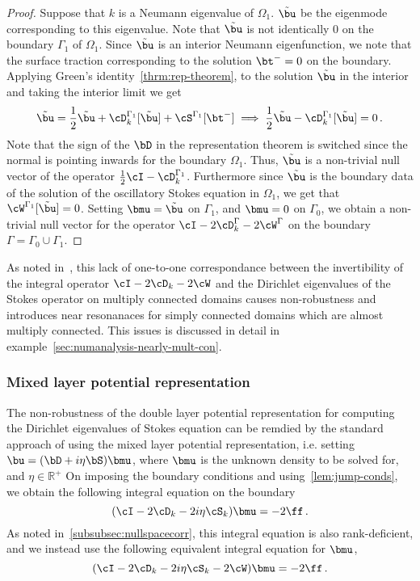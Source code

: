 \begin{proof}
Suppose that $k$ is a Neumann eigenvalue of $\Omega_{1}$. 
$\tilde{\bu}$ be the eigenmode corresponding to this eigenvalue. 
Note that $\tilde{\bu}$ is not identically $0$ on the boundary $\Gamma_{1}$
of $\Omega_{1}$.
Since $\tilde{\bu}$ is an interior Neumann eigenfunction, we note that
the surface traction corresponding to the solution $\bt^{-} = 0$
on the boundary.
Applying Green's identity~\cref{thrm:rep-theorem}, to the solution 
$\tilde{\bu}$ in the interior and taking the interior limit we get
\begin{equation}
\tilde{\bu} = \frac{1}{2}\tilde{\bu} + \cD^{\Gamma_{1}}_{k}[\tilde{\bu}] +
\cS^{\Gamma_{1}} [\bt^{-}] \implies \frac{1}{2} \tilde{\bu} - \cD^{\Gamma_{1}}_{k}[\tilde{\bu}]
= 0\, .
\end{equation}
Note that the sign of the $\bD$ in the representation theorem is switched
since the normal is pointing inwards for the boundary $\Omega_{1}$.
Thus, $\tilde{\bu}$ is a non-trivial null vector of the operator 
$\frac{1}{2}\cI - \cD^{\Gamma_{1}}_{k}$. 
Furthermore since $\tilde{\bu}$ is the boundary data of 
the solution of the oscillatory Stokes equation in $\Omega_{1}$, we
get that $\cW^{\Gamma_{1}}[\tilde{\bu}] = 0$.
Setting $\bmu = \tilde{\bu}$ on $\Gamma_{1}$, and $\bmu = 0$ on $\Gamma_{0}$,
we obtain a non-trivial null vector for the operator $\cI - 2\cD^{\Gamma}_{k} -2\cW^{\Gamma}$
on the boundary $\Gamma = \Gamma_{0} \cup \Gamma_{1}$.
\end{proof}

As noted in~\cite{zhao2015robust}, this lack of one-to-one correspondance between
the invertibility of the integral operator $\cI - 2\cD_{k} - 2\cW$
and the Dirichlet eigenvalues of the Stokes operator on multiply
connected domains causes non-robustness and introduces near 
resonanaces for simply connected domains
which are almost multiply connected. 
This issues is discussed in detail
in example~\cref{sec:numanalysis-nearly-mult-con}.

\subsubsection{Mixed layer potential representation}
\label{subsec:mixedanalysis}
The non-robustness of the double layer potential representation
for computing the Dirichlet eigenvalues of Stokes equation can be remdied
by the standard approach of using the mixed layer potential representation,
i.e. setting
$\bu = (\bD + i\eta \bS)
\bmu$, 
where $\bmu$ is the unknown density to be solved for, and $\eta \in \mathbb{R}^{+}$ 
On imposing the boundary conditions and using~\cref{lem:jump-conds}, 
we obtain the following integral equation on the boundary 
\begin{equation}
(\cI - 2\cD_{k} - 2i\eta \cS_{k}) \bmu = -2 \ff \, . 
\end{equation}
As noted in~\cref{subsubsec:nullspacecorr}, this integral equation 
is also rank-deficient, and we instead use the following 
equivalent integral equation for $\bmu$,
\begin{equation}
(\cI - 2\cD_{k} -2i\eta \cS_{k}  -2\cW)\bmu = -2 \ff \, .
\end{equation}

